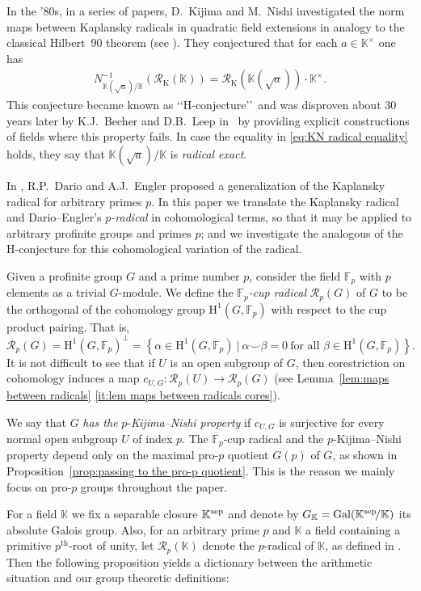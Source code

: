 \documentclass{amsart}
\theoremstyle{definition}
\theoremstyle{remark}
\DeclareMathOperator{\Gal}{Gal}
\newcommand{\KK}{\mathbb{K}}
\newcommand{\FF}{\mathbb{F}}
\newcommand{\calR}{\mathcal{R}}
\newcommand{\rmH}{\mathrm H}%
\newcommand{\set}[2]{\left\lbrace{#1}\ \big\vert\ {#2}\right\rbrace}
\begin{document}
In the '80s, in a series of papers, D.~Kijima and M.~Nishi investigated the norm maps between Kaplansky radicals in quadratic field extensions in analogy to the classical Hilbert~90 theorem (see \cite{KijimaNishi1981,KijimaNishi1983,KijimaNishi1985}). They conjectured that for each $a\in \KK^\times$ one has
\begin{align}
\label{eq:KN radical equality}
    N_{\KK(\sqrt{a})/\KK}^{-1}({\calR}_{\mathrm{K}}(\KK))={\calR}_{\mathrm{K}}(\KK(\sqrt{a}))\cdot\KK^\times .
\end{align}
This conjecture became known as \lq\lq H-conjecture\rq\rq\ and was disproven about 30 years later by K.J.~Becher and D.B.~Leep in~ \cite{BecherLeep2014} by providing explicit constructions of fields where this property fails. In case the equality in \eqref{eq:KN radical equality} holds, they say that $\KK(\sqrt{a})/\KK$ is \emph{radical exact}.

{ In \cite{DarioEngler}, R.P.~Dario and A.J.~Engler proposed a generalization of the Kaplansky radical for arbitrary primes $p$.
In this paper we translate the Kaplansky radical and Dario--Engler's {\it $p$-radical} in cohomological terms, so that it may be applied to arbitrary profinite groups and primes $p$}; and we investigate the analogous of the H-conjecture for this cohomological variation of the radical.

Given a profinite group $G$ and a prime number $p$, consider the field $\FF_p$ with $p$ elements as a trivial $G$-module. We define the $\FF_p$\emph{-cup radical} $\calR_p(G)$ of $G$ to be the orthogonal of the cohomology group $\rmH^1(G,\FF_p)$ with respect to the cup product pairing. That is,
\[
 \calR_p(G)=\rmH^1(G,\FF_p)^\perp=\set{\alpha\in\rmH^1(G,\FF_p)}{\alpha\smallsmile\beta=0\:\text{for all }\beta\in\rmH^1(G,\FF_p)}.
\]
It is not difficult to see that if $U$ is an open subgroup of $G$, then corestriction on cohomology induces a map $c_{U,G}:\calR_p(U)\to \calR_p(G)$ (see Lemma~\ref{lem:maps between radicals} \ref{it:lem maps between radicals cores}).

We say that $G$ \emph{has the} $p$-\emph{Kijima--Nishi property} if $c_{U,G}$ is surjective for every normal open subgroup $U$ of index $p$.
The $\FF_p$-cup radical and the $p$-Kijima--Nishi property depend only on the maximal pro-$p$ quotient $G(p)$ of $G$, as shown in Proposition~\ref{prop:passing to the pro-p quotient}. This is the reason we mainly focus on pro-$p$ groups throughout the paper.

For a field $\KK$ we fix a separable closure $\KK^{\rm sep}$ and denote by $G_\KK=\Gal(\KK^{\rm sep}\!/\KK)$ its absolute Galois group. 
Also, for an arbitrary prime $p$ and $\KK$ a field containing a primitive $p^{\mathrm{th}}$-root of unity, let $\calR_p(\KK)$ denote the $p$-radical of $\KK$, as defined in \cite{DarioEngler}.
Then the following proposition yields a dictionary between the arithmetic situation and our group theoretic definitions:
\end{document}
